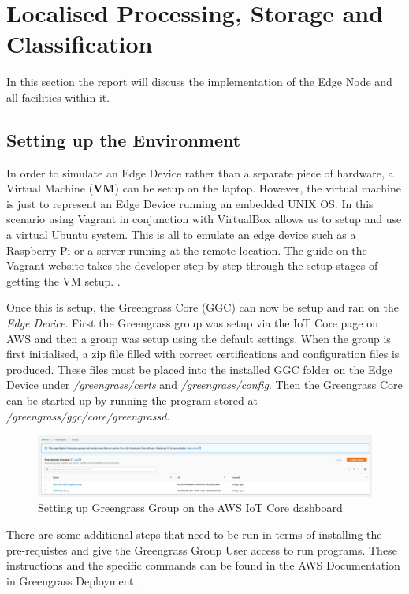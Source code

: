 \section{Localised Processing, Storage and Classification}
In this section the report will discuss the implementation of the Edge Node and all facilities within it.
\subsection{Setting up the Environment}
In order to simulate an Edge Device rather than a separate piece of hardware, a Virtual Machine (\textbf{VM}) can be setup on the laptop. However, the virtual machine is just to represent an Edge Device running an embedded UNIX OS. In this scenario using Vagrant in conjunction with VirtualBox allows us to setup and use a virtual Ubuntu system. This is all to emulate an edge device such as a Raspberry Pi or a server running at the remote location. The guide on the Vagrant website takes the developer step by step through the setup stages of getting the VM setup. \cite{installing_vagrant}. 

Once this is setup, the Greengrass Core (GGC) can now be setup and ran on the \textit{Edge Device}. First the Greengrass group was setup via the IoT Core page on AWS and then a group was setup using the default settings. When the group is first initialised, a zip file filled with correct certifications and configuration files is produced. These files must be placed into the installed GGC folder on the Edge Device under \textit{/greengrass/certs} and \textit{/greengrass/config}. Then the Greengrass Core can be started up by running the program stored at \textit{/greengrass/ggc/core/greengrassd}.

\begin{figure}[ht]
    \centering
    \includegraphics[width=1\linewidth]{pages/Chapter4/Chapter 4 Images/greengrass_group.png}
    \caption{Setting up Greengrass Group on the AWS IoT Core dashboard}
    \label{fig:my_label}
\end{figure}

There are some additional steps that need to be run in terms of installing the pre-requistes and give the Greengrass Group User access to run programs. These instructions and the specific commands can be found in the AWS Documentation in Greengrass Deployment \cite{greengrass_deployment}.

